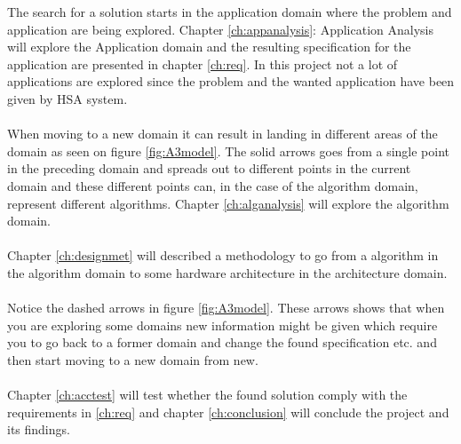 The search for a solution starts in the application domain where the problem and application are being explored. Chapter \vref{ch:appanalysis}: Application Analysis will explore the Application domain and the resulting specification for the application are presented in chapter \vref{ch:req}. In this project not a lot of applications are explored since the problem and the wanted application have been given by HSA system.\\~\\
When moving to a new domain it can result in landing in different areas of the domain as seen on figure \vref{fig:A3model}. The solid arrows goes from a single point in the preceding domain and spreads out to different points in the current domain and these different points can, in the case of the algorithm domain, represent different algorithms. Chapter \vref{ch:alganalysis} will explore the algorithm domain.\\~\\
Chapter \vref{ch:designmet} will described a methodology to go from a algorithm in the algorithm domain to some hardware architecture in the architecture domain.\\~\\
Notice the dashed arrows in figure \vref{fig:A3model}. These arrows shows that when you are exploring some domains new information might be given which require you to go back to a former domain and change the found specification etc. and then start moving to a new domain from new.\\~\\
Chapter \vref{ch:acctest} will test whether the found solution comply with the requirements in \vref{ch:req} and chapter \vref{ch:conclusion} will conclude the project and its findings. 




